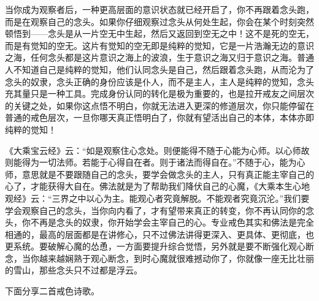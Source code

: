 当你成为观察者后，一种更高层面的意识状态就已经开启了，你不再跟着念头跑，而是在观察自己的念头。如果你仔细观察过念头从何处生起，你会在某个时刻突然顿悟到——念头是从一片空无中生起，然后又返回到空无之中！这不是死的空无，而是有觉知的空无。这片有觉知的空无即是纯粹的觉知，它是一片浩瀚无边的意识之海，任何念头都是这片意识之海上的波浪，生于意识之海又归于意识之海。普通人不知道自己是纯粹的觉知，他们认同念头是自己，然后跟着念头跑，从而沦为了念头的奴隶，念头正确的身份应该是仆人，而不是主人，主人是纯粹的觉知，念头充其量只是一种工具。完成身份认同的转化是极为重要的，也是拉开戒友之间层次的关键之处，如果你这点悟不明白，你就无法进入更深的修道层次，你只能停留在普通的戒色层次，一旦你哪天真正悟明白了，你就有望活出自己的本体，本体亦即纯粹的觉知！

《大乘宝云经》云：“如是观察住心念处。则便能得不随于心能为心师。以心师故则能得为一切法师。若能于心得自在者。则于诸法而得自在。”不随于心，能为心师，意思就是不要跟随自己的念头，要学会做念头的主人，只有真正能主宰自己的心了，才能获得大自在。佛法就是为了帮助我们降伏自己的心魔，《大乘本生心地观经》云：“三界之中以心为主。能观心者究竟解脱。不能观者究竟沉沦。”我们要学会观察自己的念头，当你向内看了，才有望带来真正的转变，你不再认同你的念头，你不再是念头的奴隶，你开始学会主宰自己的心。专业戒色其实和佛法是完全相通的，最高的层面都是在讲修心，只不过佛法讲得更深入、更具体、更彻底，也更系统。要破解心魔的怂恿，一方面要提升综合觉悟，另外就是要不断强化观心断念，当你越来越娴熟于观心断念，到时心魔就很难撼动你了，你就像一座无比壮丽的雪山，那些念头只不过都是浮云。

下面分享二首戒色诗歌。

